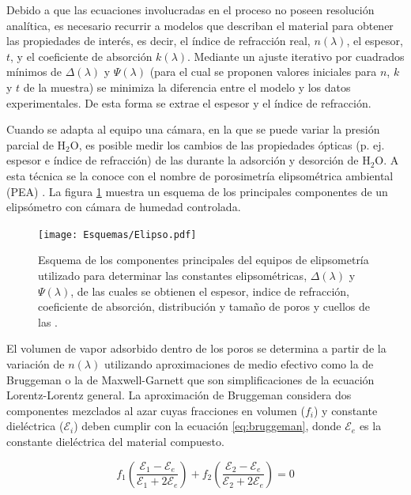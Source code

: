 		Debido a que las ecuaciones involucradas en el proceso no poseen resolución analítica, es necesario recurrir a modelos que describan el material para obtener las propiedades de interés, es decir, el índice de refracción real, $n(\lambda)$, el espesor, $t$, y el coeficiente de absorción $k(\lambda)$. Mediante un ajuste iterativo por cuadrados mínimos de $\Delta(\lambda)$ y $\Psi(\lambda)$ (para el cual se proponen valores iniciales para $n$, $k$ y $t$ de la muestra) se minimiza la diferencia entre el modelo y los datos experimentales. De esta forma se extrae el espesor y el índice de refracción. \cite{TompkinsHarlandG.1999}

		Cuando se adapta al equipo una cámara, en la que se puede variar la presión parcial de H$_2$O, es posible medir los cambios de las propiedades ópticas (p. ej. espesor e índice de refracción) de las \pdm\space durante la adsorción y desorción de H$_2$O. A esta técnica se la conoce con el nombre de porosimetría elipsométrica ambiental (PEA) \cite{Boissiere2005}. La figura \ref{fig:elipso} muestra un esquema de los principales componentes de un elipsómetro con cámara de humedad controlada.

			  \begin{figure}[h]
				\begin{center}
				\texttt{[image: Esquemas/Elipso.pdf]}
			  	\caption[Esquema de la técncia de elipsoporosimetría ambiental]{Esquema de los componentes principales del equipos de elipsometría utilizado para determinar las constantes elipsométricas, $\Delta(\lambda)$ y $\Psi(\lambda)$, de las cuales se obtienen el espesor, indice de refracción, coeficiente de absorción, distribución y tamaño de poros y cuellos de las \pdm.}
			  	\label{fig:elipso}
			  	\end{center}
			  	\end{figure}
		
		El volumen de vapor adsorbido dentro de los poros se determina a partir de la variación de $n(\lambda)$ utilizando aproximaciones de medio efectivo como la de Bruggeman\cite{Bruggeman1935} o la de Maxwell-Garnett\cite{Garnett1906} que son simplificaciones de la ecuación Lorentz-Lorentz general\cite{TompkinsHarlandG.1999}.
		La aproximación de Bruggeman considera dos componentes mezclados al azar cuyas fracciones en volumen ($f_i$) y constante dieléctrica ($\mathcal{E}_i$) deben cumplir con la ecuación \ref{eq:bruggeman}, donde $\mathcal{E}_e$ es la constante dieléctrica del material compuesto. 
				
				\begin{equation}
				 f_1\left(\frac{\mathcal{E}_1-\mathcal{E}_e}{\mathcal{E}_1+2\mathcal{E}_e}\right)+
				 f_2\left(\frac{\mathcal{E}_2-\mathcal{E}_e}{\mathcal{E}_2+2\mathcal{E}_e}\right)=0
			     \label{eq:bruggeman}
				 \end{equation}
		
